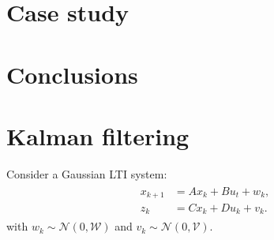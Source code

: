 \documentclass{ifacconf}
\begin{document}
% 
%
%    
  
    
    \section{Case study}
    
  \section{Conclusions}






\appendix

\section{Kalman filtering}
Consider a Gaussian LTI system:
 \begin{align}  \begin{aligned}
x_{k+1}&=A x_{k} + B u_t+ w_k,\\
z_k&=Cx_k+Du_k+v_k.\end{aligned} \end{align}
with $w_k\sim \mathcal N(0, \mathcal W)$ and $v_k\sim \mathcal N (0,\mathcal V)$.
\end{document}
